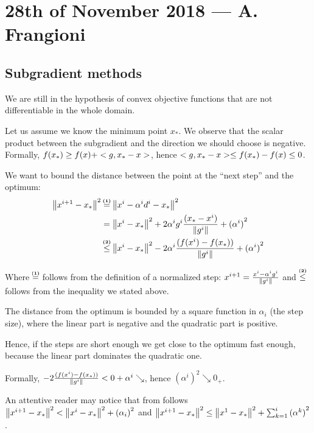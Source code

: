 \documentclass[computational_mathematics.tex]{subfiles}
\begin{document}
\section{28th of November 2018 --- A. Frangioni}

\subsection{Subgradient methods}
We are still in the hypothesis of convex objective functions that are not differentiable in the whole domain.


Let us assume we know the minimum point $x_*$. We observe that the scalar product between the subgradient and the direction we should choose is negative.
Formally, $f(x_*) \ge f(x) + <g, x_* - x>$, hence $<g, x_*-x> \le f(x_*) - f(x) \le 0$.

We want to bound the distance between the point at the ``next step'' and the optimum:
\begin{equation}
  \begin{aligned}
    \sqrnorm{x^{i+1} - x_*} &\numeq{(1)} \sqrnorm{x^i - \alpha^i d^i - x_*}\\
    &= \sqrnorm{x^i  - x_*} + 2\alpha^i g^i \frac{(x_* - x^i)}{\norm{g^i}} + {(\alpha^i)}^2\\
    &\numineq{(2)}{\le} \sqrnorm{x^i  - x_*} - 2 \alpha^i \frac{(f(x^i) - f(x_*))}{\norm{g^i}} + {(\alpha^i)}^2
  \end{aligned}\label{eq:28nov1}
\end{equation}

Where $\numeq{(1)}$ follows from the definition of a normalized step: $x^{i+1} = \frac{x^i - \alpha^i g^i}{\left\lVert g^i\right\rVert}$ and $\numineq{(2)}{\le}$ follows from the inequality we stated above.

\begin{obs}
  The distance from the optimum is bounded by a square function in $\alpha_i$ (the step size), where the linear part is negative and the quadratic part is positive.
  
  Hence, if the steps are short enough we get close to the optimum fast enough, because the linear part dominates the quadratic one.
  
  Formally, $- 2 \frac{(f(x^i) - f(x_*))}{\left\lVert g^i\right\rVert} < 0 + \alpha ^i \searrow$, hence ${(\alpha^i)}^2 \searrow 0_+$.

  An attentive reader may notice that from  follows ${\left\lVert x^{i+1}  - x_*\right\rVert}^2 < {\left\lVert x^i  - x_*\right\rVert}^2 + {(\alpha_i)}^2$ and ${\left\lVert x^{i+1} - x_*\right\rVert}^2 \leq {\left\lVert x^1  - x_*\right\rVert}^2 + \sum_{k = 1}^i {(\alpha^k)}^2$.
\end{obs}
\end{document}
